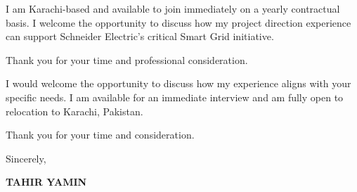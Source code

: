 \documentclass[11pt,a4paper]{article}
\begin{document}
I am Karachi-based and available to join immediately on a yearly contractual basis. I welcome the opportunity to discuss how my project direction experience can support Schneider Electric's critical Smart Grid initiative.

Thank you for your time and professional consideration.

I would welcome the opportunity to discuss how my experience aligns with your specific needs. I am available for an immediate interview and am fully open to relocation to Karachi, Pakistan.

Thank you for your time and consideration.

\vspace{0.5cm}
Sincerely,

\vspace{0.5cm}
\textbf{TAHIR YAMIN}
\end{document}
